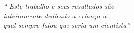 \begin{epigrafe}
	\vspace*{\fill}
	\begin{flushright}
		\textit{``
		Este trabalho e seus resultados são
		\\ inteiramente dedicado a criança a 
		\\ qual sempre falou que seria um cientista''}
	\end{flushright}
\end{epigrafe}
